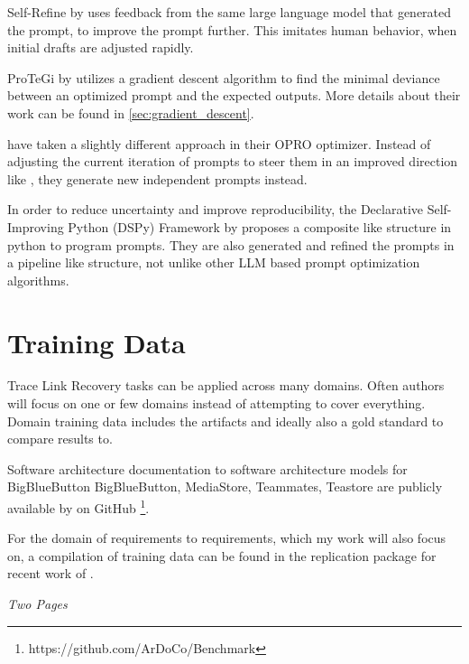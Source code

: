 Self-Refine by  uses feedback from the same large language model that generated the prompt, to improve the prompt further. This imitates human behavior, when initial drafts are adjusted rapidly. 

ProTeGi by  utilizes a gradient descent algorithm to find the minimal deviance between an optimized prompt and the expected outputs. More details about their work can be found in \ref{sec:gradient_descent}.

 have taken a slightly different approach in their OPRO optimizer. Instead of adjusting the current iteration of prompts to steer them in an improved direction like \citeauthor{pryzant2023AutomaticPrompt}, they generate new independent prompts instead.

In order to reduce uncertainty and improve reproducibility, the Declarative Self-Improving Python (DSPy) Framework by  proposes a composite like structure in python to program prompts. They are also generated and refined the prompts in a pipeline like structure, not unlike other LLM based prompt optimization algorithms. 

\section{Training Data}
Trace Link Recovery tasks can be applied across many domains. Often authors will focus on one or few domains instead of attempting to cover everything. Domain training data includes the artifacts and ideally also a gold standard to compare results to.

Software architecture documentation to software architecture models for BigBlueButton
BigBlueButton, MediaStore, Teammates, Teastore are publicly available by  on GitHub \footnote{https://github.com/ArDoCo/Benchmark}.

For the domain of requirements to requirements, which my work will also focus on, a compilation of training data can be found in the replication package\cite{hey2025ReplicationPackage} for recent work of \citeauthor{hey2025RequirementsTraceability}.





\cite{madaan2023SelfRefineIterative}




\textit{Two Pages}